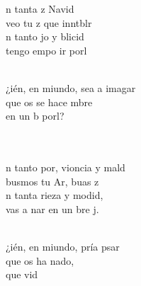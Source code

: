 \begin{cancion}%
	n tanta z  Navid\\
	 veo tu z que inntblr \\
	n tanto jo y blicid\\
	 tengo empo  ir  porl \\\jump\\
	\begin{chorus}%
	¿ién, en miundo, sea a imagar \\
	que os se hace mbre\\
	en un b porl?  \\
	\end{chorus}%
	\jump\\
	  \\
\jump
	n tanto por, vioncia y mald\\
	busmos tu Ar, buas  z \\
	n tanta rieza y modid,\\
	 vas a nar en un bre j. \\\jump\\
	\begin{chorus}%
	¿ién, en miundo, pría psar \\
	que os ha nado,\\
	que  vid \\
	\end{chorus}%
	\jump\\

\end{cancion}
